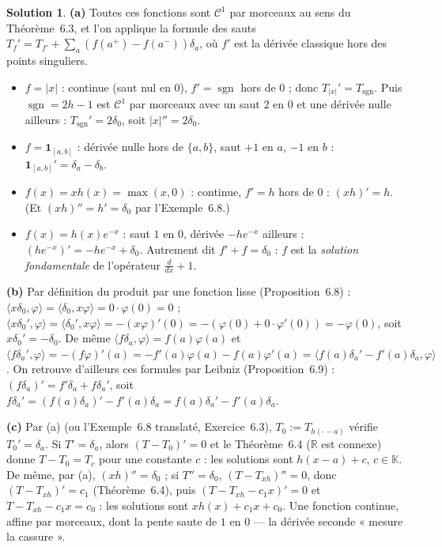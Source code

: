 \documentclass[11pt,a4paper]{article}
\newcommand{\R}{\mathbb{R}}
\newcommand{\K}{\mathbb{K}}
\DeclareMathOperator{\sgn}{sgn}
\theoremstyle{definition}
\newtheorem*{solution}{Solution}
\begin{document}
\begin{solution}
\noindent\textbf{(a)} Toutes ces fonctions sont $\mathcal C^1$ par morceaux au sens du Théorème~6.3, et l'on applique la formule des sauts $T_f'=T_{f'}+\sum_a(f(a^+)-f(a^-))\delta_a$, où $f'$ est la dérivée classique hors des points singuliers.
\begin{itemize}
  \item $f=|x|$ : continue (saut nul en $0$), $f'=\sgn$ hors de $0$ ; donc $T_{|x|}'=T_{\sgn}$. Puis $\sgn=2h-1$ est $\mathcal C^1$ par morceaux avec un saut $2$ en $0$ et une dérivée nulle ailleurs : $T_{\sgn}'=2\delta_0$, soit $|x|''=2\delta_0$.
  \item $f=\mathbf 1_{[a,b]}$ : dérivée nulle hors de $\{a,b\}$, saut $+1$ en $a$, $-1$ en $b$ : $\mathbf 1_{[a,b]}'=\delta_a-\delta_b$.
  \item $f(x)=xh(x)=\max(x,0)$ : continue, $f'=h$ hors de $0$ : $(xh)'=h$. (Et $(xh)''=h'=\delta_0$ par l'Exemple~6.8.)
  \item $f(x)=h(x)e^{-x}$ : saut $1$ en $0$, dérivée $-he^{-x}$ ailleurs : $(he^{-x})'=-he^{-x}+\delta_0$. Autrement dit $f'+f=\delta_0$ : $f$ est la \emph{solution fondamentale} de l'opérateur $\frac d{dx}+1$.
\end{itemize}

\medskip
\noindent\textbf{(b)} Par définition du produit par une fonction lisse (Proposition~6.8) : $\langle x\delta_0,\varphi\rangle=\langle\delta_0,x\varphi\rangle=0\cdot\varphi(0)=0$ ; $\langle x\delta_0',\varphi\rangle=\langle\delta_0',x\varphi\rangle=-(x\varphi)'(0)=-(\varphi(0)+0\cdot\varphi'(0))=-\varphi(0)$, soit $x\delta_0'=-\delta_0$. De même $\langle f\delta_a,\varphi\rangle=f(a)\varphi(a)$ et $\langle f\delta_a',\varphi\rangle=-(f\varphi)'(a)=-f'(a)\varphi(a)-f(a)\varphi'(a)=\langle f(a)\delta_a'-f'(a)\delta_a,\varphi\rangle$. On retrouve d'ailleurs ces formules par Leibniz (Proposition~6.9) : $(f\delta_a)'=f'\delta_a+f\delta_a'$, soit $f\delta_a'=(f(a)\delta_a)'-f'(a)\delta_a=f(a)\delta_a'-f'(a)\delta_a$.

\medskip
\noindent\textbf{(c)} Par (a) (ou l'Exemple~6.8 translaté, Exercice~6.3), $T_0:=T_{h(\cdot-a)}$ vérifie $T_0'=\delta_a$. Si $T'=\delta_a$, alors $(T-T_0)'=0$ et le Théorème~6.4 ($\R$ est connexe) donne $T-T_0=T_c$ pour une constante $c$ : les solutions sont $h(x-a)+c$, $c\in\K$. De même, par (a), $(xh)''=\delta_0$ ; si $T''=\delta_0$, $(T-T_{xh})''=0$, donc $(T-T_{xh})'=c_1$ (Théorème~6.4), puis $(T-T_{xh}-c_1x)'=0$ et $T-T_{xh}-c_1x=c_0$ : les solutions sont $xh(x)+c_1x+c_0$. Une fonction continue, affine par morceaux, dont la pente saute de $1$ en $0$ — la dérivée seconde « mesure la cassure ».


\end{solution}
\end{document}
